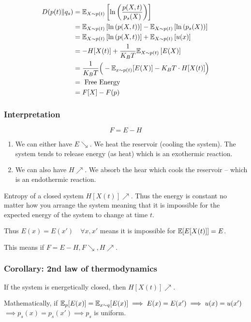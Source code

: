 \begin{align*}
D(p(t)\| q_{s}) 
&= \mathbb{E}_{X\sim p(t)}\left[\ln\left(\frac{p(X, t)}{p_s(X)}\right)\right]
 \\   
&= 
\mathbb{E}_{X\sim p(t)}\left[\ln\left({p(X, t)}\right)\right]
- 
\mathbb{E}_{X\sim p(t)}\left[\ln\left({p_s(X)}\right)\right]
 \\   
&= 
\mathbb{E}_{X\sim p(t)}\left[\ln\left({p(X, t)}\right)\right]
+ 
\mathbb{E}_{X\sim p(t)}\left[u(x)\right]
 \\   
&= 
-H[X(t)]
+ 
\frac1{K_B T} \mathbb{E}_{X\sim p(t)}\left[E(X)\right]
 \\   
&= 
\frac1{K_B T}
\Big(
    -\mathbb{E}_{x\sim p(t)}[E(X)]
    - 
    K_B T \cdot H[X(t)]
\Big)
\\
&= \text{ Free Energy}
\\
&= F[X]-F(p)
\end{align*}

\subsubsection{Interpretation}
\begin{equation}
    F = E - H
\end{equation}
\begin{enumerate}
    \item We can either have $E\searrow$. We heat the reservoir (cooling the system). The system tends to release energy (as heat) which is an exothermic reaction.
    \item We can also have $H\nearrow$. We absorb the hear which cools the reservoir -- which is an endothermic reaction.
\end{enumerate}

Entropy of a closed system $H[X(t)]\nearrow$. Thus the energy is constant no matter how you arrange the system meaning that it is impossible for the expected energy of the system to change at time $t$.

Thus $E(x)=E(x')\quad\forall x,x'$ means it is impossible for $\mathbb{E}[E[X(t)]]=E$.

This means if $F=E-H, F\searrow, H\nearrow$.

\subsubsection{Corollary: 2nd law of thermodynamics}
If the system is energetically closed, then $H[X(t)]\nearrow$.

Mathematically, if $\mathbb{E}_p[E(x)]=\mathbb{E}_{x\sim q}[E(x)]\implies E(x)=E(x')\implies u(x)=u(x')$\\
$\implies p_s(x)=p_s(x')\implies p_s$ is uniform.

